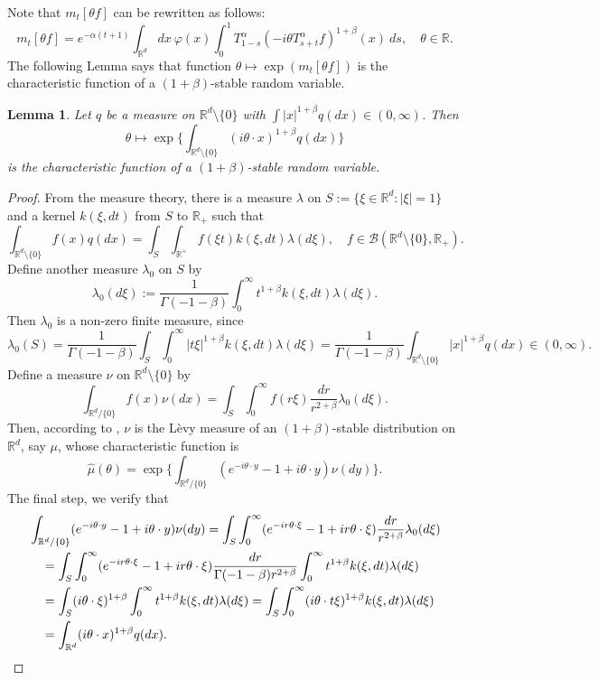 \documentclass[12pt,oneside,english]{amsart}
\theoremstyle{plain}
\newtheorem{lem}[thm]{Lemma}
\theoremstyle{definition}
\numberwithin{equation}{section}
\begin{document}
    Note that $m_t[\theta f]$ can be rewritten as follows:
\[
    m_t[\theta f]= e^{-\alpha (t+1)}\int_{\mathbb R^d} dx~\varphi(x)\int_0^1 T_{1-s}^\alpha (-i\theta T_{s+t}^\alpha f)^{1+\beta}(x)~ds,
    \quad \theta \in \mathbb R.
\]
    The following Lemma says that function $\theta \mapsto \exp(m_t[\theta f])$ is the characteristic function of a $(1+\beta)$-stable random variable.
\begin{lem}\label{lem: charactreisticfunction}
    Let $q$ be a measure on $\mathbb R^d\setminus\{0\}$ with $\int |x|^{1+\beta} q(dx) \in (0,\infty)$.
    Then $$\theta \mapsto  \exp\Big\{\int_{\mathbb R^d\setminus\{0\}} (i\theta \cdot x)^{1+\beta} q(dx)\Big\}$$
    is the characteristic function of a $(1+\beta)$-stable random variable.
\end{lem}
\begin{proof}
    From the measure theory, there is a measure $\lambda$ on $S:= \{\xi\in \mathbb R^d:|\xi| = 1\}$ and a kernel $k(\xi,dt)$ from $S$ to $\mathbb R_+$ such that
\[
    \int_{\mathbb R^d\setminus \{0\}} f(x)q(dx) = \int_S \int_{\mathbb R^+} f(\xi t)k(\xi,dt) \lambda(d\xi),\quad
    f\in \mathscr B(\mathbb R^d\setminus \{0\}, \mathbb R_+).
\]
    Define another measure $\lambda_0$ on $S$ by
\[
    \lambda_0(d\xi) := \frac{1}{\Gamma(-1-\beta)} \int_0^\infty t^{1+\beta}k(\xi,dt) \lambda (d\xi).
\]
    Then $\lambda_0$ is a non-zero finite measure, since
\[
    \lambda_0(S) = \frac{1}{\Gamma(-1-\beta)} \int_S \int_0^\infty |t\xi|^{1+\beta}k(\xi,dt) \lambda (d\xi)
    = \frac{1}{\Gamma(-1-\beta)} \int_{\mathbb R^d\setminus\{0\}} |x|^{1+\beta} q(dx) \in (0,\infty).
\]
    Define a measure $\nu$ on $\mathbb R^d\setminus\{0\}$ by
\[
    \int_{\mathbb R^d/\{0\}}f(x)\nu(dx)= \int_{S} \int_0^\infty f(r\xi) \frac{dr}{r^{2+\beta}} \lambda_0(d\xi).
\]
    Then, according to \cite[Remark 14.4]{Sato1999Levy}, $\nu$ is the L\`evy measure of an $(1+\beta)$-stable distribution on $\mathbb R^d$, say $\mu$, whose characteristic function is \[\hat \mu(\theta)=\exp\Big\{\int_{\mathbb R^d/\{0\}} (e^{-i\theta \cdot y}-1+i\theta \cdot y) \nu(dy)\Big\}.\]
    The final step, we verify that
\begin{align}
    &\int_{\mathbb R^d/\{0\}} (e^{-i\theta \cdot y}-1+i\theta \cdot y) \nu(dy)
    = \int_S \int_0^\infty (e^{-ir\theta \cdot \xi}-1+ir\theta \cdot \xi) \frac{dr}{r^{2+\beta}}\lambda_0(d\xi)
\\&\quad = \int_S \int_0^\infty (e^{-ir\theta \cdot \xi}-1+ir\theta \cdot \xi) \frac{dr}{\Gamma(-1-\beta)r^{2+\beta}}\int_0^\infty t^{1+\beta} k(\xi,dt) \lambda (d\xi)
\\&\quad = \int_S (i\theta\cdot \xi)^{1+\beta} \int_0^\infty t^{1+\beta} k(\xi,dt) \lambda (d\xi)
= \int_S \int_0^\infty (i\theta \cdot t\xi)^{1+\beta} k(\xi,dt)\lambda(d\xi)
\\&\quad = \int_{\mathbb R^d} (i\theta \cdot x)^{1+\beta} q(dx).
\qedhere
\end{align}
\end{proof}
\end{document}
